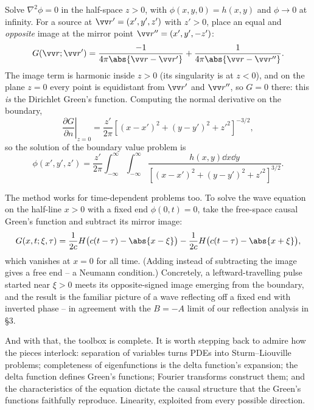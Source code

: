 \begin{example}
    Solve $\nabla^2 \phi = 0$ in the half-space $z > 0$, with $\phi(x, y, 0) = h(x, y)$ and $\phi \to 0$ at infinity.
    For a source at $\vv r' = (x', y', z')$ with $z' > 0$, place an equal and \emph{opposite} image at the mirror point $\vv r'' = (x', y', -z')$:
    $$
    G(\vv r; \vv r') = \frac{-1}{4 \pi \abs{\vv r - \vv r'}} + \frac{1}{4 \pi \abs{\vv r - \vv r''}}.
    $$
    The image term is harmonic inside $z > 0$ (its singularity is at $z < 0$), and on the plane $z = 0$ every point is equidistant from $\vv r'$ and $\vv r''$, so $G = 0$ there: this \emph{is} the Dirichlet Green's function. Computing the normal derivative on the boundary,
    $$
    \left.\frac{\partial G}{\partial n}\right|_{z = 0} = \frac{z'}{2 \pi}\left[(x - x')^2 + (y - y')^2 + z'^2\right]^{-3/2},
    $$
    so the solution of the boundary value problem is
    $$
    \phi(x', y', z') = \frac{z'}{2\pi} \int_{-\infty}^{\infty}\int_{-\infty}^{\infty} \frac{h(x, y) \dd x \dd y}{\left[(x - x')^2 + (y - y')^2 + z'^2\right]^{3/2}}.
    $$
\end{example}

\begin{example}
    The method works for time-dependent problems too. To solve the wave equation on the half-line $x > 0$ with a fixed end $\phi(0, t) = 0$, take the free-space causal Green's function and subtract its mirror image:
    $$
    G(x, t; \xi, \tau) = \frac{1}{2c}H\big(c(t - \tau) - \abs{x - \xi}\big) - \frac{1}{2c}H\big(c(t - \tau) - \abs{x + \xi}\big),
    $$
    which vanishes at $x = 0$ for all time. (Adding instead of subtracting the image gives a free end -- a Neumann condition.) Concretely, a leftward-travelling pulse started near $\xi > 0$ meets its opposite-signed image emerging from the boundary, and the result is the familiar picture of a wave reflecting off a fixed end with inverted phase -- in agreement with the $B = -A$ limit of our reflection analysis in \S 3.
\end{example}

And with that, the toolbox is complete. It is worth stepping back to admire how the pieces interlock: separation of variables turns PDEs into Sturm--Liouville problems; completeness of eigenfunctions is the delta function's expansion; the delta function defines Green's functions; Fourier transforms construct them; and the characteristics of the equation dictate the causal structure that the Green's functions faithfully reproduce. Linearity, exploited from every possible direction.

